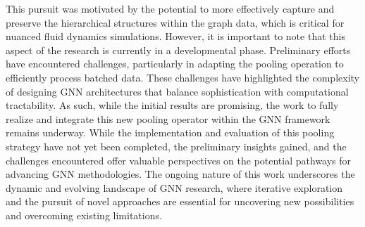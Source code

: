 This pursuit was motivated by the potential to more effectively capture and preserve the hierarchical structures within the graph data, which is critical for nuanced fluid dynamics simulations.  However, it is important to note that this aspect of the research is currently in a developmental phase. Preliminary efforts have encountered challenges, particularly in adapting the pooling operation to efficiently process batched data. These challenges have highlighted the complexity of designing GNN architectures that balance sophistication with computational tractability. As such, while the initial results are promising, the work to fully realize and integrate this new pooling operator within the GNN framework remains underway. While the implementation and evaluation of this pooling strategy have not yet been completed, the preliminary insights gained, and the challenges encountered offer valuable perspectives on the potential pathways for advancing GNN methodologies. The ongoing nature of this work underscores the dynamic and evolving landscape of GNN research, where iterative exploration and the pursuit of novel approaches are essential for uncovering new possibilities and overcoming existing limitations.

